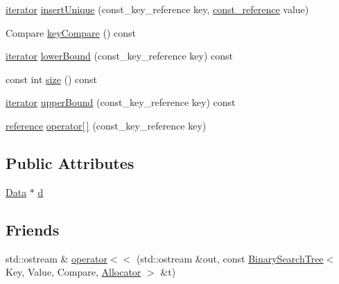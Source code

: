 \begin{DoxyCompactItemize}
\item 
\hyperlink{classprism_1_1_binary_search_tree_a8c8deaa4e3617d5833c20970ffaa0348}{iterator} \hyperlink{classprism_1_1_binary_search_tree_a554c8ebabcfc2e8fb69eaad905674f81}{insert\+Unique} (const\+\_\+key\+\_\+reference key, \hyperlink{classprism_1_1_binary_search_tree_aab75e547e4f5dd8e7f1518ec7b200937}{const\+\_\+reference} value)
\item 
Compare \hyperlink{classprism_1_1_binary_search_tree_a831a0ec78298eaea3a3efbee3f18566b}{key\+Compare} () const 
\item 
\hyperlink{classprism_1_1_binary_search_tree_a8c8deaa4e3617d5833c20970ffaa0348}{iterator} \hyperlink{classprism_1_1_binary_search_tree_aa176caaa5c5c5951cfc7ec428cf3a7b5}{lower\+Bound} (const\+\_\+key\+\_\+reference key) const 
\item 
const int \hyperlink{classprism_1_1_binary_search_tree_a6e6aa18d300c4f4cdfa121e492684b15}{size} () const 
\item 
\hyperlink{classprism_1_1_binary_search_tree_a8c8deaa4e3617d5833c20970ffaa0348}{iterator} \hyperlink{classprism_1_1_binary_search_tree_a1146631a434b05a0846d4386b2cdf874}{upper\+Bound} (const\+\_\+key\+\_\+reference key) const 
\item 
\hyperlink{classprism_1_1_binary_search_tree_ab924eeab8b8ce1edf77d02bceec9d4eb}{reference} \hyperlink{classprism_1_1_binary_search_tree_a16c3d829f1e459e49ce0cbd31eae23c6}{operator\mbox{[}$\,$\mbox{]}} (const\+\_\+key\+\_\+reference key)
\end{DoxyCompactItemize}
\subsection*{Public Attributes}
\begin{DoxyCompactItemize}
\item 
\hyperlink{structprism_1_1_b_s_t_data}{Data} $\ast$ \hyperlink{classprism_1_1_binary_search_tree_a6d5900a993bfceb52af558fa5de72bcd}{d}
\end{DoxyCompactItemize}
\subsection*{Friends}
\begin{DoxyCompactItemize}
\item 
std\+::ostream \& \hyperlink{classprism_1_1_binary_search_tree_a3ad0aca4742a5661aad32577e6f0ceb3}{operator$<$$<$} (std\+::ostream \&out, const \hyperlink{classprism_1_1_binary_search_tree}{Binary\+Search\+Tree}$<$ Key, Value, Compare, \hyperlink{classprism_1_1_allocator}{Allocator} $>$ \&t)
\end{DoxyCompactItemize}
